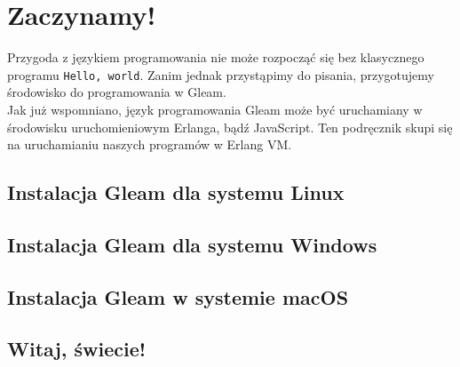 \chapter{Zaczynamy!}
Przygoda z językiem programowania nie może rozpocząć się bez klasycznego programu \texttt{Hello, world}. Zanim jednak przystąpimy do pisania, przygotujemy środowisko do programowania w Gleam. \\
Jak już wspomniano, język programowania Gleam może być uruchamiany w środowisku uruchomieniowym Erlanga, bądź JavaScript. Ten podręcznik skupi się na uruchamianiu naszych programów w Erlang VM.
\section{Instalacja Gleam dla systemu Linux}
\section{Instalacja Gleam dla systemu Windows}
\section{Instalacja Gleam w systemie macOS}
\section{Witaj, świecie!}
